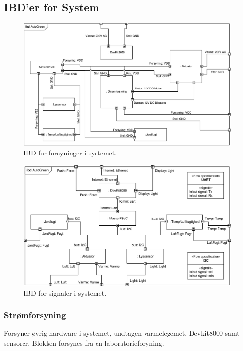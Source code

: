 \subsection{IBD'er for System}

\begin{figure}[h]
\centering 
\includegraphics[width={\textwidth-2cm}] {../fig/ibd_system_forsyninger.pdf}
\caption{IBD for forsyninger i systemet.}
\label{fig:ibd_system_forsyn}
\end{figure}

\begin{figure}[h]
\centering 
\includegraphics[width={\textwidth}-2cm] {../fig/ibd_system_signaler.pdf}
\caption{IBD for signaler i systemet.}
\label{fig:ibd_system_signal}
\end{figure}



\subsubsection{Strømforsyning}
Forsyner øvrig hardware i systemet, undtagen varmelegemet, Devkit8000 samt \IIC sensorer. Blokken forsynes fra en laboratorieforyning.
